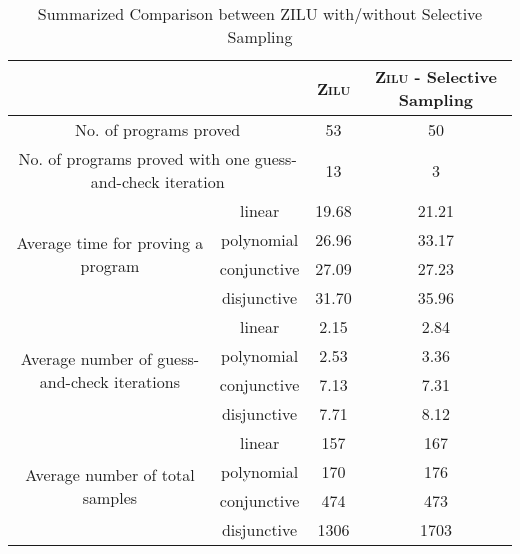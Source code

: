 \begin{table}[t]
\scriptsize
\centering
\caption{Summarized Comparison between ZILU with/without Selective Sampling}
\begin{tabular}{ c | c| c | c }
\multicolumn{2}{c|}{} & \textsc{Zilu} & \textsc{Zilu} - Selective Sampling \\
\hline
\multicolumn{2}{c|}{No. of programs proved} 			& 53 & 50		\\
\hline
\multicolumn{2}{c|}{No. of programs proved with one guess-and-check iteration} & 13 & 3		\\
\hline
\multirow{ 4}{*}{Average time for proving a program} 
 & linear & 19.68 & 21.21  			\\
 & polynomial & 26.96 & 33.17  			\\
 & conjunctive & 27.09 & 27.23  			\\
 & disjunctive & 31.70 & 35.96  			\\
\hline
\multirow{ 4}{*}{Average number of guess-and-check iterations}
& linear & 2.15 & 2.84  			\\
& polynomial & 2.53 & 3.36  			\\
& conjunctive & 7.13 & 7.31  			\\
& disjunctive & 7.71 & 8.12  			\\
\hline
\multirow{ 4}{*}{Average number of total samples}
& linear & 157 & 167  			\\
& polynomial & 170 & 176  			\\
& conjunctive & 474 & 473  			\\
& disjunctive & 1306 & 1703  			\\
\hline
\end{tabular}
\label{summary}
\end{table}


